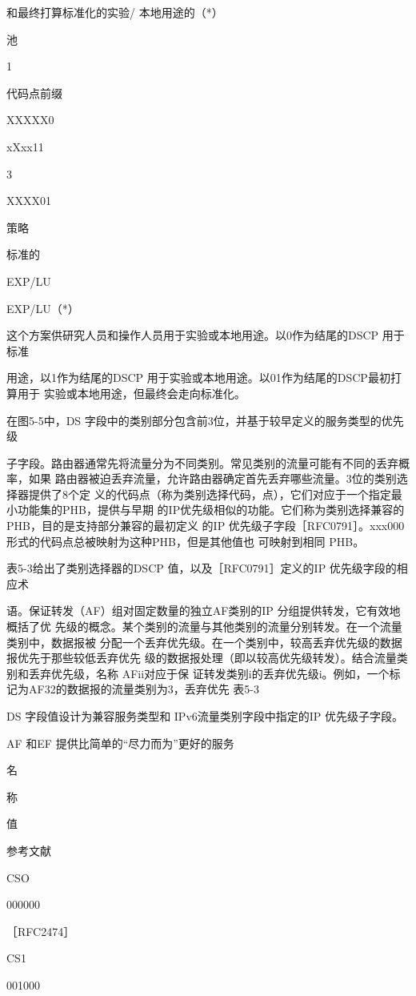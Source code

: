 和最终打算标准化的实验/ 本地用途的（*）

池

1

代码点前缀

XXXXX0

xXxx11

3

XXXX01

策略

标准的

EXP/LU

EXP/LU（*）

这个方案供研究人员和操作人员用于实验或本地用途。以0作为结尾的DSCP 用于标准

用途，以1作为结尾的DSCP 用于实验或本地用途。以01作为结尾的DSCP最初打算用于
实验或本地用途，但最终会走向标准化。

在图5-5中，DS 字段中的类别部分包含前3位，并基于较早定义的服务类型的优先级

子字段。路由器通常先将流量分为不同类别。常见类别的流量可能有不同的丢弃概率，如果
路由器被迫丢弃流量，允许路由器确定首先丢弃哪些流量。3位的类别选择器提供了8个定
义的代码点（称为类别选择代码，点），它们对应于一个指定最小功能集的PHB，提供与早期
的IP优先级相似的功能。它们称为类别选择兼容的 PHB，目的是支持部分兼容的最初定义
的IP 优先级子字段［RFC0791］。xxx000形式的代码点总被映射为这种PHB，但是其他值也
可映射到相同 PHB。

表5-3给出了类别选择器的DSCP 值，以及［RFC0791］定义的IP 优先级字段的相应术

语。保证转发（AF）组对固定数量的独立AF类别的IP 分组提供转发，它有效地概括了优
先级的概念。某个类别的流量与其他类别的流量分别转发。在一个流量类别中，数据报被
分配一个丢弃优先级。在一个类别中，较高丢弃优先级的数据报优先于那些较低丢弃优先
级的数据报处理（即以较高优先级转发）。结合流量类别和丢弃优先级，名称 AFii对应于保
证转发类别i的丢弃优先级i。例如，一个标记为AF32的数据报的流量类别为3，丢弃优先
表5-3

DS 字段值设计为兼容服务类型和 IPv6流量类别字段中指定的IP 优先级子字段。

AF 和EF 提供比简单的“尽力而为”更好的服务

名

称

值

参考文献

CSO

000000

［RFC2474］

CS1

001000

